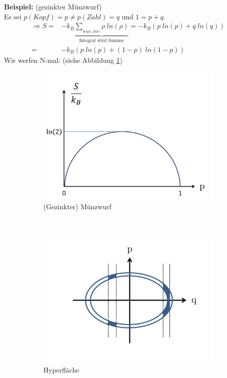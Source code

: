 \documentclass[12pt]{article}
\begin{document}
\textbf{Beispiel:} (gezinkter Münzwurf)\\
Es sei $p(Kopf) = p \neq p(Zahl)= q$ und $1=p+q$. %
\begin{align*}
\Rightarrow S =& - k_B \underbrace{\sum_{_{Kopf, Zahl}} \rho \; ln(\rho ) }_\text{Integral wird Summe} = -k_B  (p \; ln(p) + q \; ln(q)) \\
=&  -k_B ( p \; ln(p) + (1-p) \; ln(1-p))
\end{align*}
Wir werfen N-mal: (siehe Abbildung \ref{fig:Bogen})

\begin{figure}[h]
		\begin{subfigure}[h]{0.5 \textwidth}
		\centering
		\includegraphics[width=\textwidth]{Folie3.png}
		\caption{(Gezinkter) Münzwurf} 
		\label{fig:Bogen}
		\centering
	\end{subfigure}
	~
	\begin{subfigure}[h]{0.5\textwidth}
		\centering
		\includegraphics[width=\textwidth]{Folie4.png}
		\caption{Hyperfläche} 
		\label{fig:Trajektorie}
		\centering
	\end{subfigure}
	\caption{ }
\end{figure}
\end{document}

